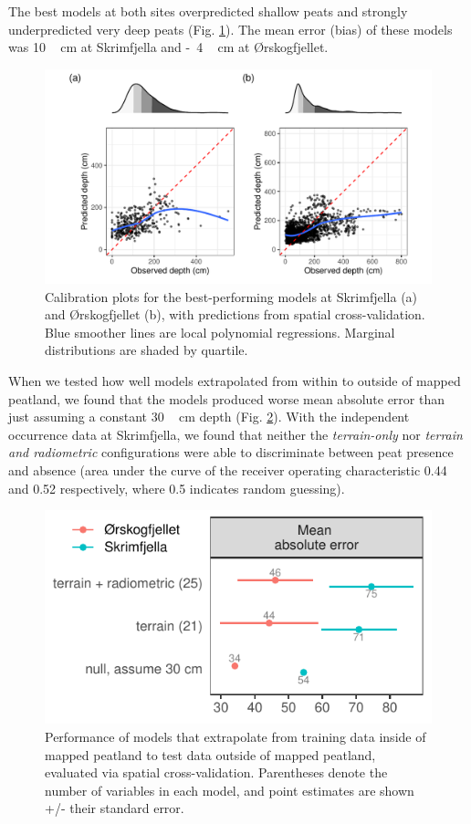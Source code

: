 \documentclass[soil, manuscript]{copernicus}
\begin{document}
The best models at both sites overpredicted shallow peats and strongly underpredicted very deep peats (Fig. \ref{fig:calPlots}).
The mean error (bias) of these models was \unit{10\,cm} at Skrimfjella and \unit{-4\,cm} at Ørskogfjellet.

\begin{figure}
\centering
\includegraphics{figures/calibration_plots.pdf}
\caption{\label{fig:calPlots}Calibration plots for the best-performing models at Skrimfjella (a) and Ørskogfjellet (b), with predictions from spatial cross-validation. Blue smoother lines are local polynomial regressions. Marginal distributions are shaded by quartile.}
\end{figure}

When we tested how well models extrapolated from within to outside of mapped peatland, we found that the models produced worse mean absolute error than just assuming a constant \unit{30\,cm} depth (Fig. \ref{fig:modelMetricsExtrapolation}).
With the independent occurrence data at Skrimfjella, we found that neither the \emph{terrain-only} nor \emph{terrain and radiometric} configurations were able to discriminate between peat presence and absence (area under the curve of the receiver operating characteristic 0.44 and 0.52 respectively, where 0.5 indicates random guessing).

\begin{figure}
\centering
\includegraphics{figures/modelmetrics-extrapolation.pdf}
\caption{\label{fig:modelMetricsExtrapolation}Performance of models that extrapolate from training data inside of mapped peatland to test data outside of mapped peatland, evaluated via spatial cross-validation. Parentheses denote the number of variables in each model, and point estimates are shown +/- their standard error.}
\end{figure}
\end{document}
